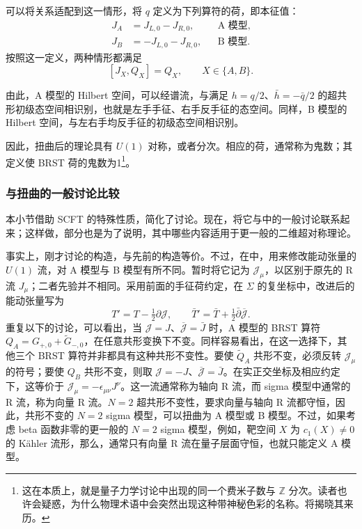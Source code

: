 可以将关系适配到这一情形，将 $q$ 定义为下列算符的荷，即本征值：
\begin{equation}\label{eq:3.101}
\begin{aligned}
J_A&=J_{L,0}-J_{R,0},&&\text{A 模型},\\
J_B&=-J_{L,0}-J_{R,0},&&\text{B 模型}.
\end{aligned}
\end{equation}
按照这一定义，两种情形都满足
\[
[J_X,Q_X]=Q_X,\qquad X\in\{A,B\}.
\]

由此，A 模型的 Hilbert 空间，可以经谱流，与满足 $h=q/2$、$\bar h=-\bar q/2$ 的超共形初级态空间相识别，也就是左手手征、右手反手征的态空间。同样，B 模型的 Hilbert 空间，与左右手均反手征的初级态空间相识别。

因此，扭曲后的理论具有 $U(1)$ 对称，或者分次。相应的荷，通常称为鬼数；其定义使 BRST 荷的鬼数为1\footnote{这在本质上，就是量子力学讨论中出现的同一个费米子数与 $\mathbb{Z}$ 分次。读者也许会疑惑，为什么物理术语中会突然出现这种带神秘色彩的名称。将揭晓其来历。}。

\subsubsection{与扭曲的一般讨论比较}\label{sec:3.3.4.5}

本小节借助 SCFT 的特殊性质，简化了讨论。现在，将它与中的一般讨论联系起来；这样做，部分也是为了说明，其中哪些内容适用于更一般的二维超对称理论。

事实上，刚才讨论的构造，与先前的构造等价。不过，在中，用来修改能动张量的 $U(1)$ 流，对 A 模型与 B 模型有所不同。暂时将它记为 $\mathcal{J}_\mu$，以区别于原先的 R 流 $J_\mu$；二者先验并不相同。采用前面的手征荷约定，在 $\Sigma$ 的复坐标中，改进后的能动张量写为
\[
T'=T-\tfrac12\partial\mathcal{J},\qquad
\bar T'=\bar T+\tfrac12\bar\partial\overline{\mathcal{J}}.
\]
重复以下的讨论，可以看出，当 $\mathcal{J}=J$、$\overline{\mathcal{J}}=\bar J$ 时，A 模型的 BRST 算符 $Q_A=G_{+,0}+\widetilde G_{-,0}$，在任意共形变换下不变。同样容易看出，在这一选择下，其他三个 BRST 算符并非都具有这种共形不变性。要使 $\widetilde Q_A$ 共形不变，必须反转 $\mathcal{J}_\mu$ 的符号；要使 $Q_B$ 共形不变，则取 $\mathcal{J}=-J$、$\overline{\mathcal{J}}=\bar J$。在实正交坐标及相应约定下，这等价于 $\mathcal{J}_\mu=-\epsilon_{\mu\nu}J^\nu$。这一流通常称为轴向 R 流，而 sigma 模型中通常的 R 流，称为向量 R 流。$N=2$ 超共形不变性，要求向量与轴向 R 流都守恒，因此，共形不变的 $N=2$ sigma 模型，可以扭曲为 A 模型或 B 模型。不过，如果考虑 beta 函数非零的更一般的 $N=2$ sigma 模型，例如，靶空间 $X$ 为 $c_1(X)\ne0$ 的 K\"ahler 流形，那么，通常只有向量 R 流在量子层面守恒，也就只能定义 A 模型。


